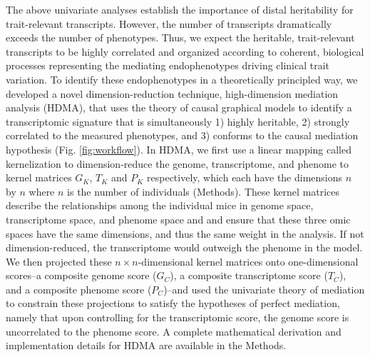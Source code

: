 \documentclass[
]{article}
\begin{document}
The above univariate analyses establish the importance of distal
heritability for trait-relevant transcripts. However, the number of
transcripts dramatically exceeds the number of phenotypes. Thus, we
expect the heritable, trait-relevant transcripts to be highly correlated
and organized according to coherent, biological processes representing
the mediating endophenotypes driving clinical trait variation. To
identify these endophenotypes in a theoretically principled way, we
developed a novel dimension-reduction technique, high-dimension
mediation analysis (HDMA), that uses the theory of causal graphical
models to identify a transcriptomic signature that is simultaneously 1)
highly heritable, 2) strongly correlated to the measured phenotypes, and
3) conforms to the causal mediation hypothesis (Fig.
\ref{fig:workflow}). In HDMA, we first use a linear mapping called
kernelization to dimension-reduce the genome, transcriptome, and phenome
to kernel matrices \(G_K\), \(T_K\) and \(P_K\) respectively, which each
have the dimensions \(n\) by \(n\) where \(n\) is the number of
individuals (Methods). These kernel matrices describe the relationships
among the individual mice in genome space, transcriptome space, and
phenome space and and ensure that these three omic spaces have the same
dimensions, and thus the same weight in the analysis. If not
dimension-reduced, the transcriptome would outweigh the phenome in the
model. We then projected these \(n \times n\)-dimensional kernel
matrices onto one-dimensional scores--a composite genome score
(\(G_C\)), a composite transcriptome score (\(T_C\)), and a composite
phenome score (\(P_C\))--and used the univariate theory of mediation to
constrain these projections to satisfy the hypotheses of perfect
mediation, namely that upon controlling for the transcriptomic score,
the genome score is uncorrelated to the phenome score. A complete
mathematical derivation and implementation details for HDMA are
available in the Methods.
\end{document}
